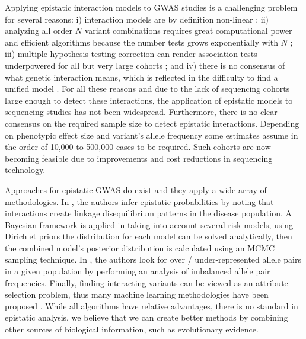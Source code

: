 Applying epistatic interaction models to GWAS studies is a challenging problem for several reasons: i) interaction models are by definition non-linear \cite{gao2010classification}; ii) analyzing all order $N$ variant combinations requires great computational power and efficient algorithms because the number tests grows exponentially with $N$ \cite{phillips2008epistasis}; iii) multiple hypothesis testing correction can render association tests underpowered for all but very large cohorts \cite{gao2010classification, phillips2008epistasis}; and iv) there is no consensus of what genetic interaction means, which is reflected in the difficulty to find a unified model \cite{phillips2008epistasis,mani2008defining}. For all these reasons and due to the lack of sequencing cohorts large enough to detect these interactions, the application of epistatic models to sequencing studies has not been widespread. Furthermore, there is no clear consensus on the required sample size to detect epistatic interactions. Depending on phenotypic effect size and variant's allele frequency some estimates assume in the order of 10,000 to 500,000 cases \cite{jostins2013using} to be required. Such cohorts are now becoming feasible due to improvements and cost reductions in sequencing technology.

Approaches for epistatic GWAS do exist and they apply a wide array of methodologies. In \cite{zhao2006test}, the authors infer epistatic probabilities by noting that interactions create linkage disequilibrium patterns in the disease population. A Bayesian framework is applied in \cite{zhang2007bayesian} taking into account several risk models, using Dirichlet priors the distribution for each model can be solved analytically, then the combined model's posterior distribution is calculated using an MCMC sampling technique. In \cite{ackermann2012systematic}, the authors look for over / under-represented allele pairs in a given population by performing an analysis of imbalanced allele pair frequencies. Finally, finding interacting variants can be viewed as an attribute selection problem, thus many machine learning methodologies have been proposed \cite{mckinney2006machine}. While all algorithms have relative advantages, there is no standard in epistatic analysis, we believe that we can create better methods by combining other sources of biological information, such as evolutionary evidence.

